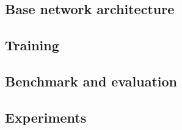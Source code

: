 

\subsection{Base network architecture}



\subsection{Training}


\subsection{Benchmark and evaluation}


\subsection{Experiments}

